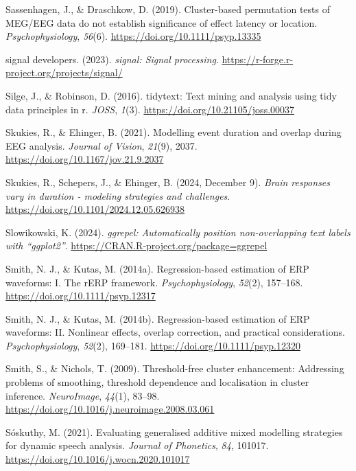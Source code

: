 \documentclass[
  doc,
  floatsintext,
  longtable,
  a4paper,
  nolmodern,
  notxfonts,
  notimes,
  colorlinks=true,linkcolor=blue,citecolor=blue,urlcolor=blue]{apa7}
\newlength{\cslhangindent}
\newenvironment{CSLReferences}[2] %
 {\begin{list}{}{%
  \setlength{\itemindent}{0pt}
  \setlength{\leftmargin}{0pt}
  \setlength{\parsep}{0pt}
  \ifodd #1
   \setlength{\leftmargin}{\cslhangindent}
   \setlength{\itemindent}{-1\cslhangindent}
  \fi
  \setlength{\itemsep}{#2\baselineskip}}}
 {\end{list}}
\begin{document}
\begin{CSLReferences}{1}{0}
Sassenhagen, J., \& Draschkow, D. (2019). Cluster{-}based permutation
tests of MEG/EEG data do not establish significance of effect latency or
location. \emph{Psychophysiology}, \emph{56}(6).
\url{https://doi.org/10.1111/psyp.13335}

signal developers. (2023). \emph{{signal}: Signal processing}.
\url{https://r-forge.r-project.org/projects/signal/}

Silge, J., \& Robinson, D. (2016). {tidytext}: Text mining and analysis
using tidy data principles in r. \emph{JOSS}, \emph{1}(3).
\url{https://doi.org/10.21105/joss.00037}

Skukies, R., \& Ehinger, B. (2021). Modelling event duration and overlap
during {EEG} analysis. \emph{Journal of Vision}, \emph{21}(9), 2037.
\url{https://doi.org/10.1167/jov.21.9.2037}

Skukies, R., Schepers, J., \& Ehinger, B. (2024, December 9).
\emph{Brain responses vary in duration - modeling strategies and
challenges}. \url{https://doi.org/10.1101/2024.12.05.626938}

Slowikowski, K. (2024). \emph{{ggrepel}: Automatically position
non-overlapping text labels with {``{ggplot2}''}}.
\url{https://CRAN.R-project.org/package=ggrepel}

Smith, N. J., \& Kutas, M. (2014a). Regression{-}based estimation of ERP
waveforms: I. The rERP framework. \emph{Psychophysiology}, \emph{52}(2),
157--168. \url{https://doi.org/10.1111/psyp.12317}

Smith, N. J., \& Kutas, M. (2014b). Regression{-}based estimation of ERP
waveforms: II. Nonlinear effects, overlap correction, and practical
considerations. \emph{Psychophysiology}, \emph{52}(2), 169--181.
\url{https://doi.org/10.1111/psyp.12320}

Smith, S., \& Nichols, T. (2009). Threshold-free cluster enhancement:
Addressing problems of smoothing, threshold dependence and localisation
in cluster inference. \emph{NeuroImage}, \emph{44}(1), 83--98.
\url{https://doi.org/10.1016/j.neuroimage.2008.03.061}

Sóskuthy, M. (2021). Evaluating generalised additive mixed modelling
strategies for dynamic speech analysis. \emph{Journal of Phonetics},
\emph{84}, 101017. \url{https://doi.org/10.1016/j.wocn.2020.101017}


\end{CSLReferences}
\end{document}
